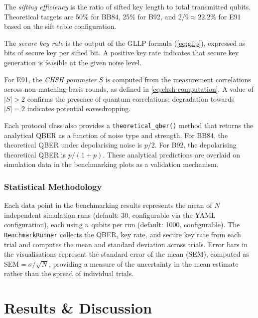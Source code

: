 \documentclass[10pt, a4paper]{report}
\begin{document}
The \textit{sifting efficiency} is the ratio of sifted key length to total transmitted qubits. Theoretical targets are 50\% for BB84, 25\% for B92, and $2/9 \approx 22.2\%$ for E91 based on the sift table configuration.

The \textit{secure key rate} is the output of the GLLP formula (\cref{eq:gllp}), expressed as bits of secure key per sifted bit. A positive key rate indicates that secure key generation is feasible at the given noise level.

For E91, the \textit{CHSH parameter} $S$ is computed from the measurement correlations across non-matching-basis rounds, as defined in \cref{eq:chsh-computation}. A value of $|S| > 2$ confirms the presence of quantum correlations; degradation towards $|S| = 2$ indicates potential eavesdropping.

Each protocol class also provides a \texttt{theoretical\_qber()} method that returns the analytical QBER as a function of noise type and strength. For BB84, the theoretical QBER under depolarising noise is $p/2$. For B92, the depolarising theoretical QBER is $p/(1+p)$. These analytical predictions are overlaid on simulation data in the benchmarking plots as a validation mechanism.

\subsection{Statistical Methodology}

Each data point in the benchmarking results represents the mean of $N$ independent simulation runs (default: 30, configurable via the YAML configuration), each using $n$ qubits per run (default: 1000, configurable). The \texttt{BenchmarkRunner} collects the QBER, key rate, and secure key rate from each trial and computes the mean and standard deviation across trials. Error bars in the visualisations represent the standard error of the mean (SEM), computed as $\text{SEM} = \sigma / \sqrt{N}$, providing a measure of the uncertainty in the mean estimate rather than the spread of individual trials.



\chapter{Results \& Discussion}
\end{document}
